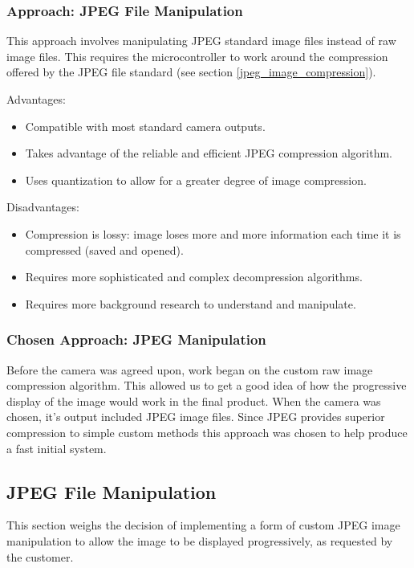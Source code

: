\subsubsection{Approach: JPEG File Manipulation}

This approach involves manipulating JPEG standard image 
files instead of raw image files. This requires the
microcontroller to work around the compression offered
by the JPEG file standard (see section \ref{jpeg_image_compression}).

Advantages:
\begin{itemize}
	\item Compatible with most standard
		camera outputs.
	\item Takes advantage of the reliable and
		efficient JPEG compression algorithm.
	\item Uses quantization to allow for a greater
		degree of image compression.
\end{itemize}

Disadvantages:
\begin{itemize}
	\item Compression is lossy: image loses 
		more and more information 
		each time it is compressed 
		(saved and opened).
	\item Requires more sophisticated and complex
		decompression algorithms.
	\item Requires more background research to
		understand and manipulate.
\end{itemize}

\subsubsection{Chosen Approach: JPEG Manipulation}

Before the camera was agreed upon, work began on the
custom raw image compression algorithm. This
allowed us to get a good idea of how the progressive
display of the image would work in the final product.
When the camera was chosen, it's output
included JPEG image files. Since JPEG provides
superior compression to simple custom methods 
this approach was chosen to help produce a fast initial system.

\subsection{JPEG File Manipulation}
\label{sec:jpegmanipulation}

This section weighs the decision of implementing a 
form of custom JPEG image manipulation to allow the 
image to be displayed progressively, as requested by the customer.

